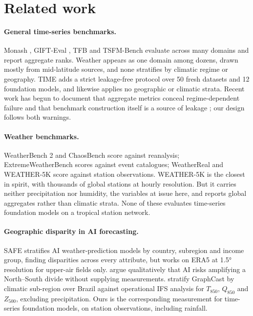 \section{Related work}
\label{sec:related}

\paragraph{General time-series benchmarks.} Monash \citep{godahewa2021monash}, GIFT-Eval \citep{aksu2024gifteval},
TFB \citep{qiu2024tfb} and TSFM-Bench \citep{li2025tsfmbench} evaluate across many domains and report aggregate
ranks. Weather appears as one domain among dozens, drawn mostly from mid-latitude sources, and none stratifies by
climatic regime or geography. TIME \citep{qiao2026time} adds a strict leakage-free protocol over 50 fresh datasets
and 12 foundation models, and likewise applies no geographic or climatic strata. Recent work has begun to document
that aggregate metrics conceal regime-dependent failure \citep{wang2026regime} and that benchmark construction
itself is a source of leakage \citep{meyer2026leakage}; our design follows both warnings.

\paragraph{Weather benchmarks.} WeatherBench 2 \citep{rasp2024weatherbench2} and ChaosBench
\citep{nathaniel2024chaosbench} score against reanalysis; ExtremeWeatherBench \citep{mcgovern2026ewb} scores
against event catalogues; WeatherReal \citep{jin2024weatherreal} and WEATHER-5K \citep{han2026weather5k} score against
station observations. WEATHER-5K is the closest in spirit, with thousands of global stations at hourly
resolution. But it carries neither precipitation nor humidity, the variables at issue here, and reports global
aggregates rather than climatic strata. None of these evaluates time-series foundation models on a tropical station network.

\paragraph{Geographic disparity in AI forecasting.} SAFE \citep{masi2025safe} stratifies AI weather-prediction
models by country, subregion and income group, finding disparities across every attribute, but works on ERA5 at
\ang{1.5} resolution for upper-air fields only. \citet{mozaffari2026inequality} argue qualitatively that AI risks
amplifying a North--South divide without supplying measurements. \citet{rowell2026brazil} stratify GraphCast by
climatic sub-region over Brazil against operational IFS analysis for \(T_{850}\), \(Q_{850}\) and \(Z_{500}\),
excluding precipitation. Ours is the corresponding measurement for time-series foundation models, on station
observations, including rainfall.

